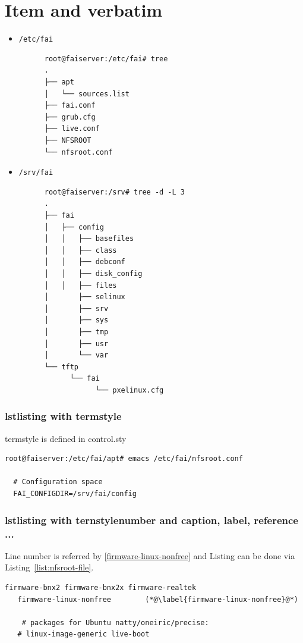 \documentclass[11pt
  , a4paper
  , article
  , oneside
]{memoir}
\begin{document}
\clearpage

\chapter{Item and verbatim}

\begin{itemize}
  \item \texttt{/etc/fai}
    {\scriptsize
     \begin{verbatim}
      root@faiserver:/etc/fai# tree
      .
      ├── apt
      │   └── sources.list
      ├── fai.conf
      ├── grub.cfg
      ├── live.conf
      ├── NFSROOT
      └── nfsroot.conf
     \end{verbatim}
     }
  \item \texttt{/srv/fai}
    {\scriptsize
     \begin{verbatim}
      root@faiserver:/srv# tree -d -L 3
      .
      ├── fai
      │   ├── config
      │   │   ├── basefiles
      │   │   ├── class
      │   │   ├── debconf
      │   │   ├── disk_config
      │   │   ├── files
      │       ├── selinux
      │       ├── srv
      │       ├── sys
      │       ├── tmp
      │       ├── usr
      │       └── var
      └── tftp
            └── fai
                  └── pxelinux.cfg
  \end{verbatim}
  }
\end{itemize}

\subsection{lstlisting with termstyle}

termstyle is defined in control.sty

\begin{lstlisting}[style=termstyle]
root@faiserver:/etc/fai/apt# emacs /etc/fai/nfsroot.conf 

  # Configuration space
  FAI_CONFIGDIR=/srv/fai/config
\end{lstlisting}


\subsection{lstlisting with ternstylenumber and caption, label, reference  ... }

Line number is referred by \ref{firmware-linux-nonfree} and Listing can be done via Listing~\ref{list:nfsroot-file}. 

\begin{lstlisting}[style=termstylenumber, caption={Editing \texttt{/etc/fai/NFSROOT}}, label={list:nfsroot-file}]
   firmware-bnx2 firmware-bnx2x firmware-realtek
   firmware-linux-nonfree        (*@\label{firmware-linux-nonfree}@*) 

    # packages for Ubuntu natty/oneiric/precise:
   # linux-image-generic live-boot
\end{lstlisting}
\end{document}
